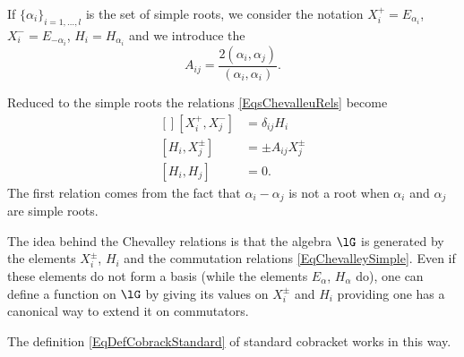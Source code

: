 \begin{definition}  \label{DefORftFjP}
    If \( \{ \alpha_i \}_{i=1,\ldots,l}\) is the set of simple roots, we consider the notation \( X_i^+=E_{\alpha_i}\), \( X^-_i=E_{-\alpha_i}\), \( H_i=H_{\alpha_i}\) and we introduce the 
    \begin{equation}
        A_{ij}=\frac{ 2(\alpha_i,\alpha_j) }{ (\alpha_i,\alpha_i) }.
    \end{equation}
\end{definition}
Reduced to the simple roots the relations \eqref{EqsChevalleuRels} become
\begin{equation}        \label{EqChevalleySimple}
    \begin{aligned}[]
        [X^+_i,X^-_j]&=\delta_{ij}H_i\\
        [H_i,X^{\pm}_j]&=\pm A_{ij}X^{\pm}_j\\
        [H_i,H_j]&=0.
    \end{aligned}
\end{equation}
The first relation comes from the fact that \( \alpha_i-\alpha_j\) is not a root when \( \alpha_i\) and \( \alpha_j\) are simple roots. 

\begin{remark}
    The idea behind the Chevalley relations  is that the algebra \( \lG\) is generated by the elements \( X^{\pm}_i\), \( H_i\) and the commutation relations \eqref{EqChevalleySimple}. Even if these elements do not form a basis (while the elements \( E_{\alpha}\), \( H_{\alpha}\) do), one can define a function on \( \lG\) by giving its values on \( X^{\pm}_i\) and \( H_i\) providing one has a canonical way to extend it on commutators.

    The definition \ref{EqDefCobrackStandard} of standard cobracket works in this way.
\end{remark}

